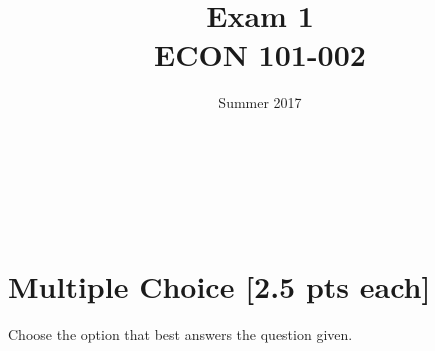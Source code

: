\documentclass[addpoints,11pt]{exam}
\theoremstyle{definition}
\newcommand{\dd}[1]{}
\begin{document}
\title{\textbf{Exam 1} \dd{Solutions} \\ \vspace{2 mm} {\large ECON 101-002}}
\author{Summer 2017}
\date{}
\maketitle

\\

\\

\\



\section*{Multiple Choice [2.5 pts each]}

Choose the option that best answers the question given.
\end{document}
